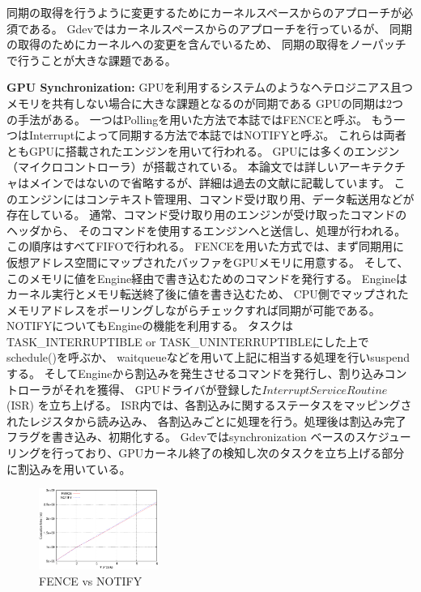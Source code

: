 同期の取得を行うように変更するためにカーネルスペースからのアプローチが必須である。
Gdevではカーネルスペースからのアプローチを行っているが、
同期の取得のためにカーネルへの変更を含んでいるため、
同期の取得をノーパッチで行うことが大きな課題である。

\textbf{GPU Synchronization:}
GPUを利用するシステムのようなヘテロジニアス且つメモリを共有しない場合に大きな課題となるのが同期である
GPUの同期は2つの手法がある。
一つはPollingを用いた方法で本誌ではFENCEと呼ぶ。
もう一つはInterruptによって同期する方法で本誌ではNOTIFYと呼ぶ。
これらは両者ともGPUに搭載されたエンジンを用いて行われる。
GPUには多くのエンジン（マイクロコントローラ）が搭載されている。
本論文では詳しいアーキテクチャはメインではないので省略するが、詳細は過去の文献\cite{kato:timegraph,fujii:apsys2013}に記載しています。
このエンジンにはコンテキスト管理用、コマンド受け取り用、データ転送用などが存在している。
通常、コマンド受け取り用のエンジンが受け取ったコマンドのヘッダから、
そのコマンドを使用するエンジンへと送信し、処理が行われる。
この順序はすべてFIFOで行われる。
FENCEを用いた方式では、まず同期用に仮想アドレス空間にマップされたバッファをGPUメモリに用意する。
そして、このメモリに値をEngine経由で書き込むためのコマンドを発行する。
Engineはカーネル実行とメモリ転送終了後に値を書き込むため、
CPU側でマップされたメモリアドレスをポーリングしながらチェックすれば同期が可能である。
NOTIFYについてもEngineの機能を利用する。
タスクはTASK\_INTERRUPTIBLE or TASK\_UNINTERRUPTIBLEにした上でschedule()を呼ぶか、
waitqueueなどを用いて上記に相当する処理を行いsuspendする。
そしてEngineから割込みを発生させるコマンドを発行し、割り込みコントローラがそれを獲得、
GPUドライバが登録した$Interrupt Service Routine$ (ISR) を立ち上げる。
ISR内では、各割込みに関するステータスをマッピングされたレジスタから読み込み、
各割込みごとに処理を行う。処理後は割込み完了フラグを書き込み、初期化する。
Gdevではsynchronization ベースのスケジューリングを行っており、GPUカーネル終了の検知し次のタスクを立ち上げる部分に割込みを用いている。

\begin{figure}[t]
\begin{center}
\includegraphics[width=0.35\textwidth]{img/poll_vs_irq}
\caption{FENCE vs NOTIFY}
\end{center}
\label{fig:poll_vs_irq}
\end{figure}

